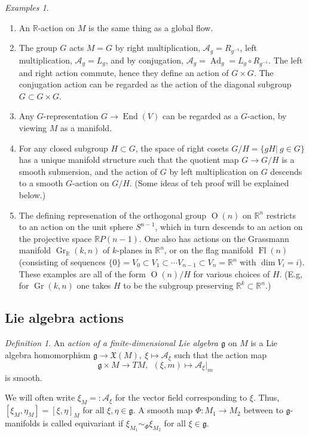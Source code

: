 \documentclass{article}
\theoremstyle{remark}
\newtheorem{definition}[theorem]{Definition}
\newtheorem{examples}[theorem]{Examples}
\newcommand\A{\mathcal{A}}
\newcommand{\R}{\mathbb{R}}
\newcommand\lie[1]{\mathfrak{#1}}
\newcommand{\g}{\lie{g}}
\newcommand{\on}{\operatorname}
\newcommand{\Ad}{ \on{Ad} }
\newcommand{\mf}{\mathfrak}
\begin{document}
\begin{examples}
\begin{enumerate}
\item 
An $\R$-action on $M$ is the same thing as a global flow. 
\item 
The group $G$ acts $M=G$ by right multiplication, $\A_g=R_{g^{-1}}$, left multiplication, 
$\A_g=L_g$, and by conjugation, $\A_g=\Ad_g=L_g\circ R_{g^{-1}}$. The left and right action commute, hence 
they define an action of $G\times G$. The conjugation action can be regarded as the action of the diagonal 
subgroup $G\subset G\times G$. 
\item 
Any $G$-representation $G\to \on{End}(V)$ can be regarded as a $G$-action, by viewing $M$ as a manifold.  
\item 
For any closed subgroup $H\subset G$, the space of right cosets $G/H=\{gH|\ g\in G\}$ has a unique manifold structure 
such that the quotient map $G\to G/H$  is a smooth submersion, and the action of $G$ by left multiplication on $G$ 
descends to a smooth $G$-action on $G/H$. (Some ideas of teh proof will be explained below.)  
\item 
The defining represenation of the orthogonal group $\on{O}(n)$ on $\R^n$ restricts to an action on the unit 
sphere $S^{n-1}$, which in turn descends to an action on the projective space $\R P(n-1)$. One also has 
actions on the Grassmann manifold $\on{Gr}_\R(k,n)$ of $k$-planes in $\R^n$, or on the flag manifold
$\on{Fl}(n)$ (consisting of sequences $\{0\}=V_0\subset V_1\subset \cdots V_{n-1}\subset V_n=\R^n$ with 
$\dim V_i=i$). These examples are all of the form  $\on{O}(n)/H$ for various choices of $H$. (E.g, 
for $\on{Gr}(k,n)$ one takes $H$ to be the subgroup preserving $\R^k\subset \R^n$.) 
\end{enumerate}
\end{examples}

\subsection{Lie algebra actions}

\begin{definition}
An {\em action of a finite-dimensional Lie algebra $\g$} on $M$ is a 
Lie algebra homomorphism $\g\to \mf{X}(M),\ \xi\mapsto \A_\xi$ 
such that the action map
%
$$ \g\times M\to TM,\ \ (\xi,m)\mapsto \A_\xi|_m$$ 
%
is smooth. 
 
\end{definition}
We will often write $\xi_M=:\A_\xi$ for the vector field corresponding to $\xi$. Thus, 
$[\xi_M,\eta_M]=[\xi,\eta]_M$ for all $\xi,\eta\in\g$.  A smooth map 
$\Phi\colon M_1\to M_2$ between to $\g$-manifolds is called equivariant if 
$\xi_{M_1}\sim_\Phi \xi_{M_2}$ for all $\xi\in\g$. 
\end{document}
